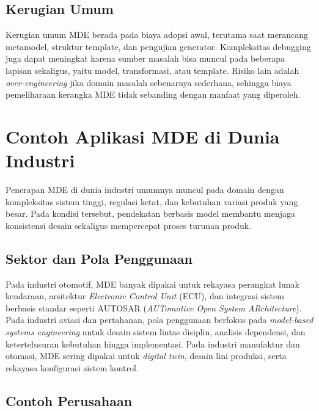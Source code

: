 \subsection{Kerugian Umum}\label{subsec:mde-kerugian-umum}

Kerugian umum MDE berada pada biaya adopsi awal, terutama saat merancang metamodel, struktur template, dan pengujian generator. Kompleksitas debugging juga dapat meningkat karena sumber masalah bisa muncul pada beberapa lapisan sekaligus, yaitu model, transformasi, atau template. Risiko lain adalah \textit{over-engineering} jika domain masalah sebenarnya sederhana, sehingga biaya pemeliharaan kerangka MDE tidak sebanding dengan manfaat yang diperoleh.

\section[Contoh Aplikasi MDE di Dunia Industrisec]{Contoh Aplikasi MDE di Dunia Industri}\label{sec:mde-industri}

Penerapan MDE di dunia industri umumnya muncul pada domain dengan kompleksitas sistem tinggi, regulasi ketat, dan kebutuhan variasi produk yang besar. Pada kondisi tersebut, pendekatan berbasis model membantu menjaga konsistensi desain sekaligus mempercepat proses turunan produk.

\subsection[Sektor dan Pola Penggunaansubsec]{Sektor dan Pola Penggunaan}\label{subsec:mde-sektor-penggunaan}

Pada industri otomotif, MDE banyak dipakai untuk rekayasa perangkat lunak kendaraan, arsitektur \textit{Electronic Control Unit} (ECU), dan integrasi sistem berbasis standar seperti AUTOSAR (\textit{AUTomotive Open System ARchitecture}). Pada industri aviasi dan pertahanan, pola penggunaan berfokus pada \textit{model-based systems engineering} untuk desain sistem lintas disiplin, analisis dependensi, dan ketertelusuran kebutuhan hingga implementasi. Pada industri manufaktur dan otomasi, MDE sering dipakai untuk \textit{digital twin}, desain lini produksi, serta rekayasa konfigurasi sistem kontrol.

\subsection{Contoh Perusahaan}\label{subsec:mde-contoh-perusahaan}

